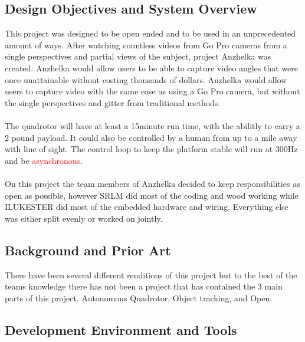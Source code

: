 \documentclass{article}
\numberwithin{equation}{section} %
\begin{document}
\subsection{Design Objectives and System Overview}

This project was designed to be open ended and to be used in an unprecedented amount of ways. After watching countless videos from Go Pro cameras from a single perspectives and partial views of the subject, project Anzhelka was created. Anzhelka would allow users to be able to capture video angles that were once unattainable without costing thousands of dollars. Anzhelka would allow users to capture video with the same ease as using a Go Pro camera, but without the single perspectives and gitter from traditional methods.\\ \\
The quadrotor will have at least a 15minute run time, with the abilitly to carry a 2 pound payload. It could also be controlled by a human from up to a mile away with line of sight. The control loop to keep the platform stable will run at 300Hz and be \textcolor{red}{asynchronous}. \\ \\
On this project the team members of Anzhelka decided to keep responsibilities as open as possible, however SRLM did most of the coding and wood working while ILUKESTER did most of the embedded hardware and wiring. Everything else was either split evenly or worked on jointly.

\subsection{Background and Prior Art}

There have been several different renditions of this project but to the best of the teams knowledge there has not been a project that has contained the 3 main parts of this project. Autonomous Quadrotor, Object tracking, and Open.

\subsection{Development Environment and Tools}
\end{document}

